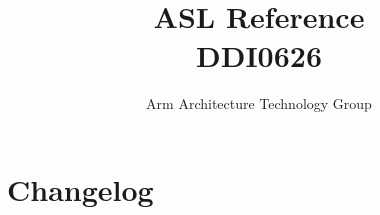 \documentclass{book}
\author{Arm Architecture Technology Group}
\title{ASL Reference \\
       DDI0626}
\begin{document}
\maketitle

\tableofcontents{}




\chapter{Changelog}

\clearpage

\clearpage

\clearpage

\clearpage

\clearpage








































\end{document}

